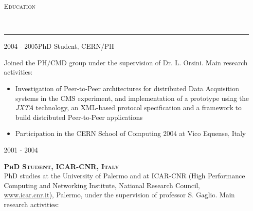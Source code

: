 \documentclass[11pt]{article}
\renewcommand{\section}[2]%
        {\vspace{1.3\baselineskip}%
         \hspace{0in}%
         {\raggedright \scshape #1}\\[-0.15\baselineskip]%
                 \rule{\columnwidth}{1pt}%
        \vspace{.5\baselineskip}%
         \hspace{0in}
}
\renewcommand{\subsection}[2]%
        {
         {\bf{\raggedright \scshape #1}}{\bf{\hfill \scshape #2}}\\[-.7\baselineskip]
}
\newenvironment{CompactItemize} {
  \begin{itemize}
  \setlength{\itemsep}{-3pt}
  \setlength{\parsep}{0pt}
  \setlength{\topsep}{-2pt}
  \setlength{\partopsep}{-2pt}
} {\end{itemize}}
\begin{document}
%


\section{Education}

\subsection{2004 - 2005}{PhD Student, CERN/PH}

Joined the PH/CMD group under the supervision of Dr. L. Orsini. Main research activities:

\begin{CompactItemize}
\item Investigation of Peer-to-Peer architectures for distributed Data Acquisition systems in the
  CMS experiment, and implementation of a prototype using the \emph{JXTA}
  technology, an XML-based protocol specification and a framework to build distributed
  Peer-to-Peer applications
\item Participation in the CERN School of Computing 2004 at Vico Equense, Italy
\end{CompactItemize}

\subsection{2001 - 2004}{PhD Student, ICAR-CNR, Italy}

PhD studies at the University of Palermo and at ICAR-CNR (High Performance Computing and Networking Institute,
National Research Council, \href{http://www.icar.cnr.it}{www.icar.cnr.it}), Palermo, under the supervision
of professor S. Gaglio. Main research activities:
\end{document}
